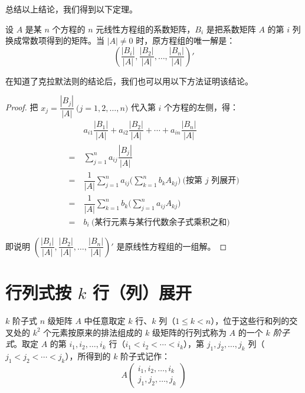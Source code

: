 总结以上结论，我们得到以下定理。

\begin{theorem}[克拉默法则]
	设 $A$ 是某 $n$ 个方程的 $n$ 元线性方程组的系数矩阵，$B_i$ 是把系数矩阵 $A$ 的第 $i$ 列换成常数项得到的矩阵。当 $|A| \ne 0$ 时，原方程组的唯一解是：
	$$
	\left( \dfrac{|B_i|}{|A|}, \dfrac{|B_2|}{|A|}, \ldots, \dfrac{|B_n|}{|A|} \right)'
	$$
\end{theorem}

在知道了克拉默法则的结论后，我们也可以用以下方法证明该结论。

\begin{proof}
	把 $x_j = \dfrac{|B_j|}{|A|} \pod{j = 1, 2, \ldots, n}$ 代入第 $i$ 个方程的左侧，得：
	$$
	\begin{aligned}&
		a_{i1} \dfrac{|B_1|}{|A|} + a_{i2} \dfrac{|B_2|}{|A|} + \cdots + a_{in} \dfrac{|B_n|}{|A|}
		\\=~&
		\sum\limits_{j = 1}^n a_{ij} \dfrac{|B_j|}{|A|}
		\\=~&
		\dfrac{1}{|A|} \sum\limits_{j = 1}^n a_{ij} \biggl( \sum\limits_{k = 1}^n b_k A_{kj} \biggr) \pod{\text{按第 $j$ 列展开}}
		\\=~&
		\dfrac{1}{|A|} \sum\limits_{k = 1}^n b_k \biggl( \sum\limits_{j = 1}^n a_{ij} A_{kj} \biggr)
		\\=~&
		b_i \pod{\text{某行元素与某行代数余子式乘积之和}}
	\end{aligned}
	$$

	即说明 $\left( \dfrac{|B_i|}{|A|}, \dfrac{|B_2|}{|A|}, \ldots, \dfrac{|B_n|}{|A|} \right)'$ 是原线性方程组的一组解。
\end{proof}

\section{行列式按 $k$ 行（列）展开}

\begin{definition}{$k$ 阶子式}
	$n$ 级矩阵 $A$ 中任意取定 $k$ 行、$k$ 列（$1 \le k < n$），位于这些行和列的交叉处的 $k^2$ 个元素按原来的排法组成的 $k$ 级矩阵的行列式称为 $A$ 的一个 \emph{$k$ 阶子式}。取定 $A$ 的第 $i_1, i_2, \ldots, i_k$ 行（$i_1 < i_2 < \cdots < i_k$），第 $j_1, j_2, \ldots, j_k$ 列（$j_1 < j_2 < \cdots < j_k$），所得到的 $k$ 阶子式记作：
	$$
	A \begin{pmatrix} i_1, i_2, \ldots, i_k \\ j_1, j_2, \ldots, j_k \end{pmatrix}
	$$
\end{definition}

